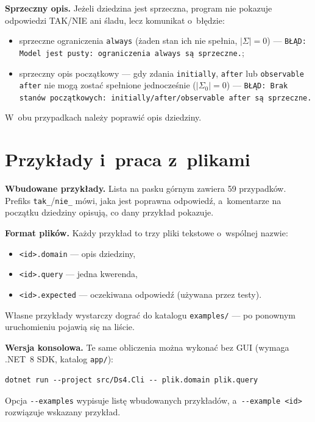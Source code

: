 \documentclass[11pt,a4paper]{article}
\begin{document}
\textbf{Sprzeczny opis.} Jeżeli dziedzina jest sprzeczna, program nie pokazuje
odpowiedzi TAK/NIE ani śladu, lecz komunikat o~błędzie:
\begin{itemize}
  \item sprzeczne ograniczenia \texttt{always} (żaden stan ich nie spełnia,
        $|\Sigma| = 0$) --- \texttt{BŁĄD: Model jest pusty: ograniczenia always
        są sprzeczne.};
  \item sprzeczny opis początkowy --- gdy zdania \texttt{initially},
        \texttt{after} lub \texttt{observable after} nie mogą zostać spełnione
        jednocześnie ($|\Sigma_0| = 0$) --- \texttt{BŁĄD: Brak stanów
        początkowych: initially/after/observable after są sprzeczne.}
\end{itemize}
W~obu przypadkach należy poprawić opis dziedziny.

\section{Przykłady i~praca z~plikami}

\textbf{Wbudowane przykłady.} Lista na pasku górnym zawiera 59 przypadków.
Prefiks \texttt{tak\_}/\texttt{nie\_} mówi, jaka jest poprawna odpowiedź,
a~komentarze na początku dziedziny opisują, co dany przykład pokazuje.

\textbf{Format plików.} Każdy przykład to trzy pliki tekstowe o~wspólnej
nazwie:
\begin{itemize}
  \item \texttt{<id>.domain} --- opis dziedziny,
  \item \texttt{<id>.query} --- jedna kwerenda,
  \item \texttt{<id>.expected} --- oczekiwana odpowiedź (używana przez testy).
\end{itemize}
Własne przykłady wystarczy dograć do katalogu \texttt{examples/} ---
po ponownym uruchomieniu pojawią się na liście.

\textbf{Wersja konsolowa.} Te same obliczenia można wykonać bez GUI
(wymaga .NET~8 SDK, katalog \texttt{app/}):
\begin{verbatim}
dotnet run --project src/Ds4.Cli -- plik.domain plik.query
\end{verbatim}
Opcja \texttt{-{}-examples} wypisuje listę wbudowanych przykładów,
a~\texttt{-{}-example <id>} rozwiązuje wskazany przykład.
\end{document}
